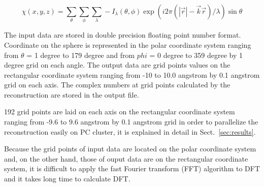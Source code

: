 \documentclass[graybox,vecphys]{svmult}
\begin{document}
\begin{equation}\label{eqn:dft3d}
  \chi(x,y,z) = \sum_{\theta} \sum_{\phi} \sum_{\lambda}
  - I_{\lambda}(\theta,\phi) \exp({i2 \pi (|\vec{r}| - \vec{k}\vec{r}) /
    \lambda}) \sin\theta
\end{equation}


The input data are stored in double precision floating point number
format. Coordinate on the sphere is represented in the polar coordinate
system ranging from $\theta$ = 1 degree to 179 degree and from $phi$ =
0 degree to 359 degree by 1 degree grid on each angle. The output data
are grid points values on the rectangular coordinate
system ranging from -10 to 10.0 angstrom by 0.1 angstrom grid on each
axis. The complex numbers at grid points
calculated by the reconstruction are stored in the output file.

192 grid points are laid on each axis on the rectangular coordinate system
ranging from -9.6 to 9.6 angstrom by 0.1 angstrom grid
in order to parallelize the reconstruction easily on PC cluster,
it is explained in detail in Sect.~\ref{sec:results}.


Because the grid points of input data are located on the polar coordinate
system and, on the other hand, those of ouput data are on
the rectangular coordinate system, it is difficult to apply the fast
Fourier transform (FFT) algorithm to DFT and it takes long time to
calculate DFT.
\end{document}
